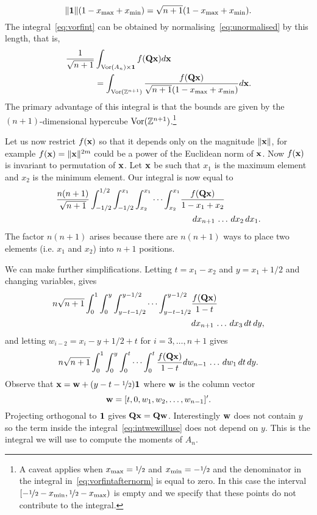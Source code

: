 \documentclass[journal]{IEEEtran}
\begin{document}
\[
\|\boldsymbol{1}\|(1 - x_{\text{max}} + x_{\text{min}}) = \sqrt{n+1}(1 - x_{\text{max}} + x_{\text{min}}).
\]
The integral~\eqref{eq:vorfint} can be obtained by normalising~\eqref{eq:unormalised} by this length, that is,
\begin{equation}\label{eq:vorfintafternorm}
\begin{split}
\frac{1}{\sqrt{n+1}} &\int_{\vor(A_n) \times \onebf} f(\Qbf\xbf) d\xbf \\
&=  \int_{\vor(\ints^{n+1})} \frac{f(\Qbf\xbf)}{\sqrt{n+1}(1 - x_{\text{max}} + x_{\text{min}})}  d\xbf.
\end{split}
\end{equation}
The primary advantage of this integral is that the bounds are given by the $(n+1)$-dimensional hypercube $\operatorname{Vor}({\mathbb Z}^{n+1})$.\footnote{A caveat applies when $x_{\text{max}} = \nicefrac{1}{2}$ and $x_{\text{min}} = -\nicefrac{1}{2}$ and the denominator in the integral in~\eqref{eq:vorfintafternorm} is equal to zero.  In this case the interval $[-\nicefrac{1}{2} - x_{\text{min}}, \nicefrac{1}{2} - x_{\text{max}})$ is empty and we specify that these points do not contribute to the integral.}

Let us now restrict $f(\mathbf{x})$ so that it depends only on the magnitude $\|\mathbf{x}\|$, for example $f(\mathbf{x}) = \|\mathbf{x}\|^{2m}$ could be a power of the Euclidean norm of $\mathbf{x}$.  Now $f(\mathbf{x})$ is invariant to permutation of $\mathbf{x}$.  Let $\mathbf{x}$ be such that $x_1$ is the maximum element and $x_2$ is the minimum element.  Our integral is now equal to
\begin{align*}
\frac{n (n+1)}{\sqrt{n+1}} \int^{1/2}_{-1/2} \int^{x_1}_{-1/2}  \int^{x_1}_{x_2} \cdots \int^{x_1}_{x_2} &\frac{f(\mathbf{Q}\mathbf{x})}{1 - x_{1} + x_{2}}  \\
&\hspace{0.5cm} dx_{n+1} \, \dots \, dx_2 \, dx_1.
\end{align*}
The factor $n(n+1)$ arises because there are $n(n+1)$ ways to place two elements (i.e. $x_1$ and $x_2$) into $n+1$ positions.

We can make further simplifications.  Letting $t = x_1 - x_2$ and $y = x_1 + 1/2$ and changing variables, gives
\begin{align*}
n \sqrt{n+1} \int^{1}_{0} \int^{y}_{0}  \int^{y - 1/2}_{y - t - 1/2} \cdots \int^{y-1/2}_{y-t-1/2} &\frac{f(\mathbf{Q}\mathbf{x} )}{1 - t}  \\
&dx_{n+1} \, \dots \, dx_3 \, dt \, dy,
\end{align*}
and letting $w_{i-2} = x_i - y + 1/2 + t$ for $i = 3,\dots,n+1$ gives
\begin{equation}\label{eq:intwewilluse}
n \sqrt{n+1} \int^{1}_{0} \int^{y}_{0}  \int^{t}_{0} \cdots \int^{t}_{0} \frac{f(\Qbf\xbf )}{1 - t}  dw_{n-1} \, \dots \, dw_1 \, dt \, dy.
\end{equation}
Observe that $\mathbf{x} = \mathbf{w} + (y - t - \nicefrac{1}{2})\boldsymbol{1}$ where $\mathbf{w}$ is the column vector
\[
\mathbf{w} = [t, 0, w_1, w_2, \dots, w_{n-1}]^\prime.
\]
Projecting orthogonal to $\boldsymbol{1}$ gives $\mathbf{Q}\mathbf{x} = \mathbf{Q} \mathbf{w}$.  Interestingly $\mathbf{w}$ does not contain $y$ so the term inside the integral~\eqref{eq:intwewilluse} does not depend on $y$.  This is the integral we will use to compute the moments of $A_n$.
\end{document}
